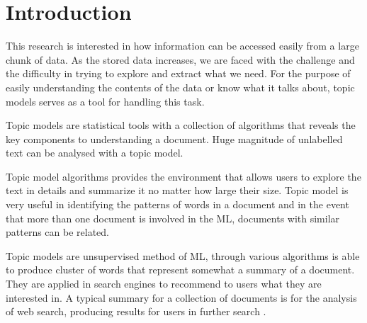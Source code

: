 \chapter{Introduction}

%
%
%

This research is interested in how information can be accessed easily from a large chunk
of data. As the stored data increases,
we are faced with the challenge and the difficulty in trying to explore and extract what we need.
For the purpose of easily understanding the contents of the data or know
what it talks about, topic models serves as a tool for handling this task.

Topic models are statistical tools with a collection of algorithms that reveals
the key components to understanding a document. Huge magnitude of unlabelled text can be analysed with a topic model.

Topic model algorithms provides the environment that allows
users to explore the text in details and summarize it no matter how large their size. Topic model is very useful in identifying the patterns of words in a document and in the event that more than one document is involved in the ML, documents with similar patterns can be related.

Topic models are unsupervised method of ML,
through various algorithms is able to produce cluster of words that represent somewhat a summary of a document. They are applied in search engines to recommend to users what they are interested in. A typical summary for a collection of documents is for the analysis of web search, producing results for users in further search \citep{turpin2007fast}.

